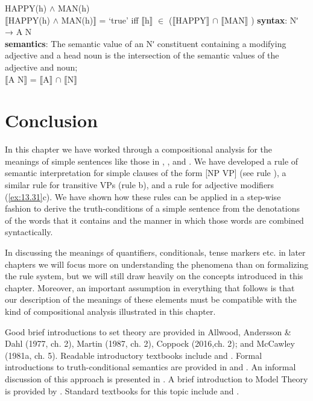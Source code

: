 \ea \label{ex:13.31}
\ea  HAPPY(h) $\wedge$ MAN(h)\\
\ex  $\llbracket$HAPPY(h) $\wedge$ MAN(h)$\rrbracket$  = ‘true’  iff  $\llbracket$h$\rrbracket$  ${\in}$ ($\llbracket$HAPPY$\rrbracket$  ${\cap}$ $\llbracket$MAN$\rrbracket$ )
\ex  \textbf{syntax}: Nʹ  →  A N\\
\textbf{semantics}: The semantic value of an Nʹ constituent containing a modifying adjective and a head noun is the intersection of the semantic values of the adjective and noun;\\
{}$\llbracket$A N$\rrbracket$  =  $\llbracket$A$\rrbracket$  ${\cap}$ $\llbracket$N$\rrbracket$ 
\z \z

\section{Conclusion}\label{sec:13.6}

In this chapter we have worked through a compositional analysis for the meanings of simple sentences like those in , , and . We have developed a rule of semantic interpretation for simple clauses of the form [NP VP] (see rule ), a similar rule for transitive VPs (rule b), and a rule for adjective modifiers (\ref{ex:13.31}c). We have shown how these rules can be applied in a step-wise fashion to derive the truth-conditions of a simple sentence from the denotations of the words that it contains and the manner in which those words are combined syntactically.



In discussing the meanings of quantifiers, conditionals, tense markers etc. in later chapters we will focus more on understanding the phenomena than on formalizing the rule system, but we will still draw heavily on the concepts introduced in this chapter. Moreover, an important assumption in everything that follows is that our description of the meanings of these elements must be compatible with the kind of compositional analysis illustrated in this chapter.



\furtherreading



Good brief introductions to set theory are provided in Allwood, Andersson \& Dahl (1977, ch. 2), Martin (1987, ch. 2), Coppock (2016,ch. 2); and McCawley (1981a, ch. 5). Readable introductory textbooks include \citet{Halmos1960} and \citet{Enderton1977}. Formal introductions to truth-conditional semantics are provided in  \citet{DowtyEtAl1981} and \citet{HeimKratzer1998}. An informal discussion of this approach is presented in \citet{Bach1989}. A brief introduction to Model Theory is provided by \citet{Hodges2013}. Standard textbooks for this topic include \citet{ChangKeisler1990} and \citet{Hodges1997}.


